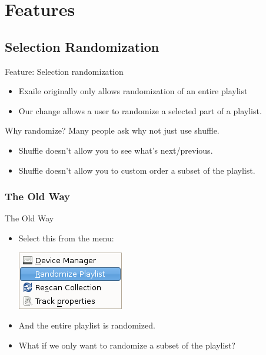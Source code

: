 \documentclass{beamer}
\begin{document}
\section{Features}

\subsection{Selection Randomization}

\begin{frame}{Feature: Selection randomization}
  \begin{itemize}
     \item Exaile originally only allows randomization of an entire playlist
     \item Our change allows a user to randomize a selected part of a playlist.
  \end{itemize}
\end{frame}

\begin{frame}{Why randomize?}
  Many people ask why not just use shuffle.
  \begin{itemize}
    \item Shuffle doesn't allow you to see what's next/previous.
	\item Shuffle doesn't allow you to custom order a subset of the playlist.
  \end{itemize}
\end{frame}

\subsubsection{The Old Way}
\begin{frame}{The Old Way}
  \begin{itemize}
    \item Select this from the menu:

    \includegraphics[keepaspectratio]{images/tools-menu}
    \item And the entire playlist is randomized.
	\item What if we only want to randomize a subset of the playlist?
  \end{itemize}
\end{frame}
\end{document}
